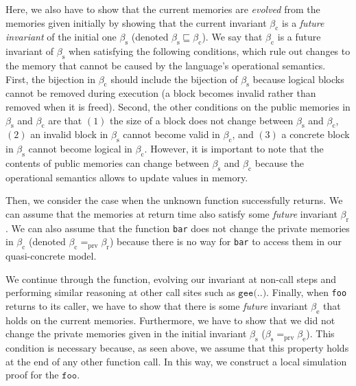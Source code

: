 Here, we also have to show that the current memories are
\emph{evolved} from the memories given initially by showing that the
current invariant $\beta_\textrm{c}$ is a \emph{future invariant} of
the initial one ${\beta_\textrm{s}}$ 
(denoted ${\beta_\textrm{s}}\sqsubseteq\beta_\textrm{c}$).
We say that $\beta_\textrm{c}$ is a future invariant of 
${\beta_\textrm{s}}$ when satisfying the following conditions,
which rule out changes to the memory that cannot be caused 
by the language's operational semantics.  
First, the bijection in
$\beta_\textrm{c}$ should include the bijection of ${\beta_\textrm{s}}$ because
logical blocks cannot be removed during execution (a block
becomes invalid rather than removed when it is freed).  Second, the other
conditions on the public memories in ${\beta_\textrm{s}}$ and
$\beta_\textrm{c}$ are that $(1)$ the size of a block does not change
between ${\beta_\textrm{s}}$ and $\beta_\textrm{c}$, $(2)$ an
invalid block in ${\beta_\textrm{s}}$ cannot become valid in
$\beta_\textrm{c}$, and $(3)$ a concrete block in
${\beta_\textrm{s}}$ cannot become logical in $\beta_\textrm{c}$.
However, it is important to note that the contents of public memories
can change between ${\beta_\textrm{s}}$ and $\beta_\textrm{c}$ because
the operational semantics allows
to update values in memory.

Then, we consider the case when the unknown function successfully
returns. We can assume that the memories at return time also satisfy some
\emph{future} invariant ${\beta_\textrm{r}}$. We can also
assume that the function \texttt{bar} does not change the private
memories in $\beta_\textrm{c}$ (denoted $\beta_\textrm{c}
=_{\textrm{prv}} {\beta_\textrm{r}}$) because there is no way
for \texttt{bar} to access them in our quasi-concrete model.

We continue through the function, evolving our invariant at non-call steps and performing similar reasoning at other call sites
such as $\texttt{gee(..)}$.  Finally, when \texttt{foo} returns to its caller, we have to
show that there is some \emph{future} invariant $\beta_\textrm{e}$
that holds on the current memories. Furthermore, we have to show that
we did not change the private memories given in
 the initial invariant $\beta_\textrm{s}$ (\ie $\beta_\textrm{s} =_{\textrm{prv}}
\beta_\textrm{e}$). This condition is necessary because, as seen above, we assume that this property holds at the end of any other function call.
In this way, we construct a local simulation proof for the $\texttt{foo}$.


